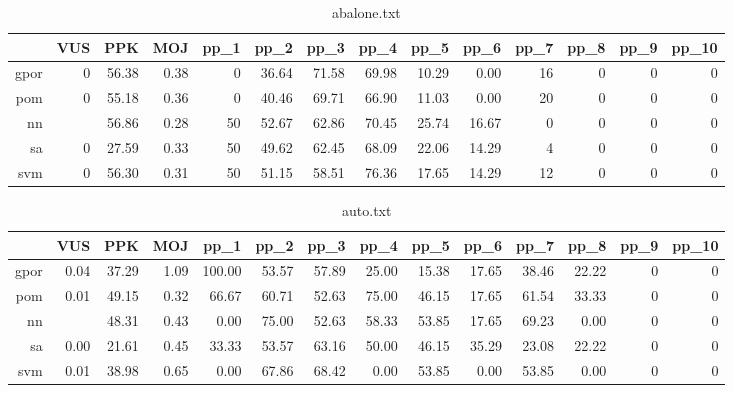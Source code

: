 \documentclass[10pt,a4paper]{article}
\begin{document}

    
\begin{table}[ht]
\centering
\begin{tabular}{rrrrrrrrrrrrrr}
  \hline
 & VUS & PPK & MOJ & pp\_1 & pp\_2 & pp\_3 & pp\_4 & pp\_5 & pp\_6 & pp\_7 & pp\_8 & pp\_9 & pp\_10 \\ 
  \hline
gpor &   0 & 56.38 & 0.38 &   0 & 36.64 & 71.58 & 69.98 & 10.29 & 0.00 &  16 &   0 &   0 &   0 \\ 
  pom &   0 & 55.18 & 0.36 &   0 & 40.46 & 69.71 & 66.90 & 11.03 & 0.00 &  20 &   0 &   0 &   0 \\ 
  nn &  & 56.86 & 0.28 &  50 & 52.67 & 62.86 & 70.45 & 25.74 & 16.67 &   0 &   0 &   0 &   0 \\ 
  sa &   0 & 27.59 & 0.33 &  50 & 49.62 & 62.45 & 68.09 & 22.06 & 14.29 &   4 &   0 &   0 &   0 \\ 
  svm &   0 & 56.30 & 0.31 &  50 & 51.15 & 58.51 & 76.36 & 17.65 & 14.29 &  12 &   0 &   0 &   0 \\ 
   \hline
\end{tabular}
\caption{abalone.txt} 
\end{table}
\begin{table}[ht]
\centering
\begin{tabular}{rrrrrrrrrrrrrr}
  \hline
 & VUS & PPK & MOJ & pp\_1 & pp\_2 & pp\_3 & pp\_4 & pp\_5 & pp\_6 & pp\_7 & pp\_8 & pp\_9 & pp\_10 \\ 
  \hline
gpor & 0.04 & 37.29 & 1.09 & 100.00 & 53.57 & 57.89 & 25.00 & 15.38 & 17.65 & 38.46 & 22.22 &   0 &   0 \\ 
  pom & 0.01 & 49.15 & 0.32 & 66.67 & 60.71 & 52.63 & 75.00 & 46.15 & 17.65 & 61.54 & 33.33 &   0 &   0 \\ 
  nn &  & 48.31 & 0.43 & 0.00 & 75.00 & 52.63 & 58.33 & 53.85 & 17.65 & 69.23 & 0.00 &   0 &   0 \\ 
  sa & 0.00 & 21.61 & 0.45 & 33.33 & 53.57 & 63.16 & 50.00 & 46.15 & 35.29 & 23.08 & 22.22 &   0 &   0 \\ 
  svm & 0.01 & 38.98 & 0.65 & 0.00 & 67.86 & 68.42 & 0.00 & 53.85 & 0.00 & 53.85 & 0.00 &   0 &   0 \\ 
   \hline
\end{tabular}
\caption{auto.txt} 
\end{table}
\end{document}
